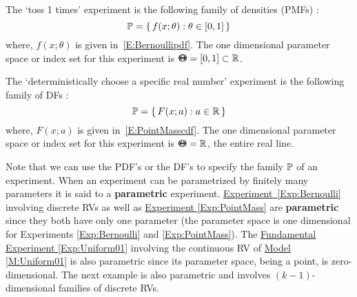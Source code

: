 \begin{Exp}[Bernoulli]\label{Exp:Bernoulli}
The `toss 1 times' experiment is the following family of densities (PMFs) :
\[
\mathbb{P} = \{ \,  f(x; \theta) :  \theta \in [0,1] \, \} 
\]
where, $f(x; \theta)$ is given in~\eqref{E:Bernoullipdf}.  The one dimensional parameter space or index set for this experiment is  ${\Theta}\mspace{-11 mu}{\Theta} = [0,1] \subset \mathbb{R}$.
\end{Exp}

\begin{Exp}\label{Exp:PointMass}
The `deterministically choose a specific real number' experiment is the following family of DFs :
\[
\mathbb{P} = \{ \,  F(x; a) :  a \in \mathbb{R} \, \} 
\]
where, $F(x; a)$ is given in~\eqref{E:PointMasscdf}.  The one dimensional parameter space or index set for this experiment is ${\Theta}\mspace{-11 mu}{\Theta} = \mathbb{R}$, the entire real line.
\end{Exp}
Note that we can use the PDF's or the DF's to specify the family $\mathbb{P}$ of an experiment.  When an experiment can be parametrized by finitely many parameters it is said to a {\bf parametric} experiment.  \hyperref[Exp:Bernoulli]{Experiment~\ref*{Exp:Bernoulli}} involving discrete RVs as well as \hyperref[Exp:PointMass]{Experiment \ref*{Exp:PointMass}} are {\bf parametric} since they both have only one parameter (the parameter space is one dimensional for Experiments \ref*{Exp:Bernoulli} and \ref*{Exp:PointMass}).   The \hyperref[Exp:Uniform01]{Fundamental Experiment \ref*{Exp:Uniform01}} involving the continuous RV of \hyperref[M:Uniform01]{Model \ref*{M:Uniform01}} is also parametric since its parameter space, being a point, is zero-dimensional.  The next example is also parametric and involves $(k-1)$-dimensional families of discrete RVs.

